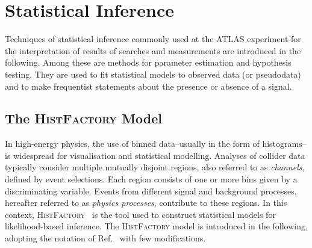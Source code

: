\section{Statistical Inference}%
\label{sec:statistical_inference}

Techniques of statistical inference commonly used at the ATLAS experiment for
the interpretation of results of searches and measurements are introduced in the
following. Among these are methods for parameter estimation and hypothesis
testing. They are used to fit statistical models to observed data (or
pseudodata) and to make frequentist statements about the presence or absence of
a signal.


\subsection{The \textsc{HistFactory} Model}%
\label{sec:histfactory}

In high-energy physics, the use of binned data--usually in the form of
histograms--is widespread for visualisation and statistical modelling. Analyses
of collider data typically consider multiple mutually disjoint regions, also
referred to as \emph{channels}, defined by event selections. Each region
consists of one or more bins given by a discriminating variable. Events from
different signal and background processes, hereafter referred to as
\emph{physics processes}, contribute to these regions. In this context,
\textsc{HistFactory}~\cite{cranmer2012} is the tool used to construct
statistical models for likelihood-based inference. The \textsc{HistFactory}
model is introduced in the following, adopting the notation of
Ref.~\cite{cranmer2012} with few modifications.

